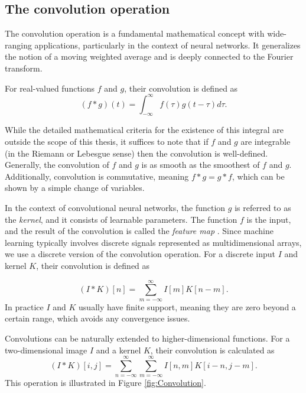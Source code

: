 \documentclass[../../thesis.tex]{subfiles}
\begin{document}
\subsection{The convolution operation}

The convolution operation is a fundamental mathematical concept with wide-ranging applications, particularly in the context of neural networks. It generalizes the notion of a moving weighted average and is deeply connected to the Fourier transform.\newline

For real-valued functions $f$ and $g$, their convolution is defined as
\begin{equation}
    (f*g)(t) = \int_{-\infty}^{\infty} f(\tau)g(t-\tau) d\tau.
\end{equation}

While the detailed mathematical criteria for the existence of this integral are outside the scope of this thesis, it suffices to note that if $f$ and $g$ are integrable (in the Riemann or Lebesgue sense) then the convolution is well-defined. Generally, the convolution of $f$ and $g$ is as smooth as the smoothest of $f$ and $g$. Additionally, convolution is commutative, meaning $f*g = g*f$, which can be shown by a simple change of variables. \newline


In the context of convolutional neural networks, the function $g$ is referred to as the \textit{kernel}, and it consists of learnable parameters. The function $f$ is the input, and the result of the convolution is called the \textit{feature map} \cite{deeplearningbook}. Since machine learning typically involves discrete signals represented as multidimensional arrays, we use a discrete version of the convolution operation. For a discrete input $I$ and kernel $K$, their convolution is defined as

\begin{equation}
    (I*K)[n] = \sum_{m=-\infty}^{\infty} I[m]K[n-m].
\end{equation}
In practice $I$ and $K$ usually have finite support, meaning they are zero beyond a certain range, which avoids any convergence issues.\newline

Convolutions can be naturally extended to higher-dimensional functions. For a two-dimensional image $I$ and a kernel $K$, their convolution is calculated as 
\begin{equation}
    (I*K)[i,j] = \sum_{n=-\infty}^{\infty}\sum_{m=-\infty}^{\infty} I[n,m]K[i - n,j - m]. 
\end{equation}
This operation is illustrated in Figure \ref{fig:Convolution}.\newline
\end{document}
